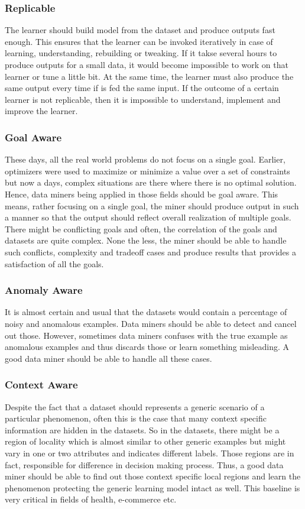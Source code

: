 \documentclass[sigplan]{acmart}\settopmatter{printfolios=true,printccs=false,printacmref=false}
\begin{document}
\subsubsection{Replicable}
The learner should build model from the dataset and produce outputs fast enough. This ensures that the learner can be invoked iteratively in case of learning, understanding, rebuilding or tweaking. If it takse several hours to produce outputs for a small data, it would become impossible to work on that learner or tune a little bit. At the same time, the learner must also produce the same output every time if is fed the same input. If the outcome of a certain learner is not replicable, then it is impossible to understand, implement and improve the learner. 

\subsubsection{Goal Aware}
These days, all the real world problems do not focus on a single goal. Earlier, optimizers were used to maximize or minimize a value over a set of constraints but now a days, complex situations are there where there is no optimal solution. Hence, data miners being applied in those fields should be goal aware. This means, rather focusing on a single goal, the miner should produce output in such a manner so that the output should reflect overall realization of multiple goals. There might be conflicting goals and often, the correlation of the goals and datasets are quite complex. None the less, the miner should be able to handle such conflicts, complexity and tradeoff cases and produce results that provides a satisfaction of all the goals.  

\subsubsection{Anomaly Aware}
It is almost certain and usual that the datasets would contain a percentage of noisy and anomalous examples. Data miners should be able to detect and cancel out those. However, sometimes data miners confuses with the true example as anomalous examples and thus discards those or learn something misleading. A good data miner should be able to handle all these cases.

\subsubsection{Context Aware}
Despite the fact that a dataset should represents a generic scenario of a particular phenomenon, often this is the case that many context specific information are hidden in the datasets. So in the datasets, there might be a region of locality which is almost similar to other generic examples but might vary in one or two attributes and indicates different labels. Those regions are in fact, responsible for difference in decision making process. Thus, a good data miner should be able to find out those context specific local regions and learn the phenomenon protecting the generic learning model intact as well. This baseline is very critical in fields of health, e-commerce etc.
\end{document}
